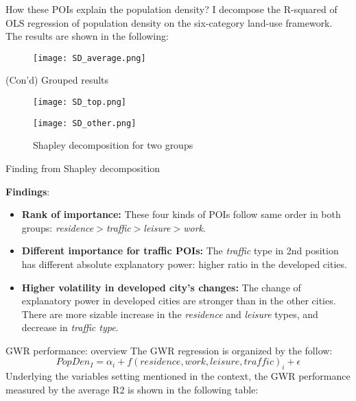 \documentclass[aspectratio=169,xcolor=dvipsnames]{beamer}
\begin{document}
\begin{frame}{How these POIs explain the population density?}
	I decompose the R-squared of OLS regression of population density on the six-category land-use framework. The results are shown in the following:
	\begin{figure}
	\texttt{[image: SD\_average.png]}
	\end{figure}	\end{frame}
\begin{frame}{(Con'd) Grouped results}
	\begin{figure}[h]
		\centering
		\begin{minipage}[b]{0.49\textwidth}
			\texttt{[image: SD\_top.png]}
			\caption{Top cities}
			\label{fig:SD_top}
		\end{minipage}
		\hfill %
		\begin{minipage}[b]{0.49\textwidth}
			\texttt{[image: SD\_other.png]}
			\caption{The others}
			\label{fig:SD_other}
		\end{minipage}
		\caption{Shapley decomposition for two groups}
		\end{figure}	\end{frame}
\begin{frame}{Finding from Shapley decomposition}

{\large \textbf{Findings}:}
\begin{itemize}
	\item \textbf{Rank of importance: }These four kinds of POIs follow same order in both groups: \textit{residence$>$traffic$>$leisure$>$work}.
	\item \textbf{Different importance for traffic POIs:} The \textit{traffic} type in 2nd position has different absolute explanatory power: higher ratio in the developed cities.
	\item \textbf{Higher volatility in developed city's changes:} The change of explanatory power in developed cities are stronger than in the other cities. There are more sizable increase in the \textit{residence} and \textit{leisure} types, and decrease in \textit{traffic type}.
\end{itemize}
\end{frame}
\begin{frame}{GWR performance: overview}
	The GWR regression is organized by the follow:
	\begin{equation}
	PopDen_{I}=\alpha_i+f(residence,work,leisure,traffic)_i+\epsilon
	\end{equation}
	Underlying the variables setting mentioned in the context, the GWR performance measured by the average R2 is shown in the following table:
	
\end{frame}
\end{document}
